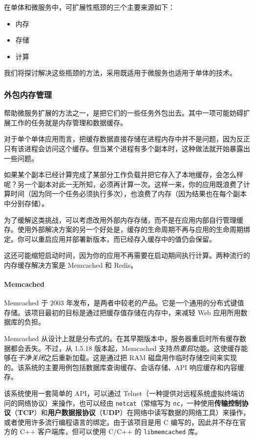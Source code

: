 \label{idx:1421}
在单体和微服务中，可扩展性瓶颈的三个主要来源如下：

\begin{itemize}
\item 内存
\item 存储
\item 计算
\end{itemize}

我们将探讨解决这些瓶颈的方法，采用既适用于微服务也适用于单体的技术。

\subsubsection{外包内存管理}

\label{idx:1422}
帮助微服务扩展的方法之一，是把它们的一些任务外包出去。其中一项可能妨碍扩展工作的任务就是内存管理和数据缓存。

对于单个单体应用而言，把缓存数据直接存储在进程内存中并不是问题，因为反正只有该进程会访问这个缓存。但当某个进程有多个副本时，这种做法就开始暴露出一些问题。

如果某个副本已经计算完成了某部分工作负载并把它存入了本地缓存，会怎么样呢？另一个副本对此一无所知，必须再计算一次。这样一来，你的应用既浪费了计算时间（因为同一个任务必须执行多次），也浪费了内存（因为结果也在每个副本中分别存储）。

为了缓解这类挑战，可以考虑改用外部内存存储，而不是在应用内部自行管理缓存。使用外部解决方案的另一个好处是，缓存的生命周期不再与应用的生命周期绑定。你可以重启应用并部署新版本，而已经存入缓存中的值仍会保留。

这还可能缩短启动时间，因为你的应用不再需要在启动期间执行计算。两种流行的内存缓存解决方案是 Memcached 和 Redis。

\paragraph{Memcached}

\label{idx:1423}
Memcached 于 2003 年发布，是两者中较老的产品。它是一个通用的分布式键值存储。该项目最初的目标是通过把缓存值存储在内存中，来减轻 Web 应用所用数据库的负担。

Memcached 从设计上就是分布式的。在其早期版本中，服务器重启时所有缓存数据都会丢失。不过，从 1.5.18 版本起，Memcached 支持\emph{热重启}功能。这使缓存能够在\emph{干净关闭}之后重新加载。这是通过把 RAM 磁盘用作临时存储空间来实现的。该系统的主要用例包括数据库查询缓存、会话存储、API 响应缓存和内容缓存。

\label{idx:1424}
\label{idx:1425}
\label{idx:1426}
\label{idx:1427}
该系统使用一套简单的 API，可以通过 Telnet（一种提供对远程系统虚拟终端访问的网络协议）来操作，也可以经由 \texttt{netcat}（常缩写为 \texttt{nc}，一种使用\textbf{传输控制协议}（\textbf{TCP}）和\textbf{用户数据报协议}（\textbf{UDP}）在网络中读写数据的网络工具）来操作，或者使用许多流行编程语言的绑定。由于该项目是用 C 编写的，因此并不存在官方的 C++ 客户端库，但可以使用 C/C++ 的 \texttt{libmemcached} 库。

